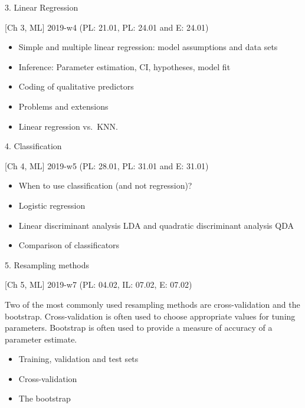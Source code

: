 \documentclass[10pt,ignorenonframetext,]{beamer}
\providecommand{\tightlist}{%
  \setlength{\itemsep}{0pt}\setlength{\parskip}{0pt}}
\begin{document}
\begin{frame}

\begin{block}{3. Linear Regression}

{[}Ch 3, ML{]} 2019-w4 (PL: 21.01, PL: 24.01 and E: 24.01)

\begin{itemize}
\tightlist
\item
  Simple and multiple linear regression: model assumptions and data sets
\item
  Inference: Parameter estimation, CI, hypotheses, model fit
\item
  Coding of qualitative predictors
\item
  Problems and extensions
\item
  Linear regression vs.~KNN.
\end{itemize}

\end{block}

\begin{block}{4. Classification}

{[}Ch 4, ML{]} 2019-w5 (PL: 28.01, PL: 31.01 and E: 31.01)

\begin{itemize}
\tightlist
\item
  When to use classification (and not regression)?
\item
  Logistic regression
\item
  Linear discriminant analysis LDA and quadratic discriminant analysis
  QDA
\item
  Comparison of classificators
\end{itemize}

\end{block}

\end{frame}

\begin{frame}

\begin{block}{5. Resampling methods}

{[}Ch 5, ML{]} 2019-w7 (PL: 04.02, IL: 07.02, E: 07.02)

Two of the most commonly used resampling methods are cross-validation
and the bootstrap. Cross-validation is often used to choose appropriate
values for tuning parameters. Bootstrap is often used to provide a
measure of accuracy of a parameter estimate.

\begin{itemize}
\tightlist
\item
  Training, validation and test sets
\item
  Cross-validation
\item
  The bootstrap
\end{itemize}

\end{block}

\end{frame}
\end{document}
